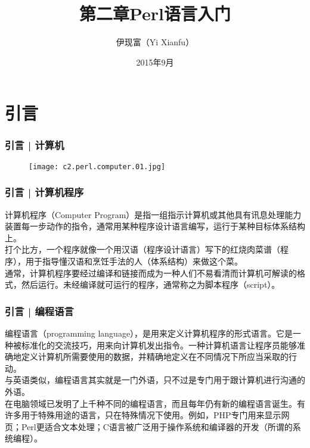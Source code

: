 



\title[Perl语言入门]{第二章\quad Perl语言入门}
\author[Yixf]{伊现富（Yi Xianfu）}
\date{2015年9月}



\section{引言}
\begin{frame}
  \frametitle{引言 | 计算机}
  \begin{figure}
    \centering
    \texttt{[image: c2.perl.computer.01.jpg]}
  \end{figure}
\end{frame}

\begin{frame}
  \frametitle{引言 | 计算机程序}
  计算机程序（Computer Program）是指一组指示计算机或其他具有讯息处理能力装置每一步动作的指令，通常用某种程序设计语言编写，运行于某种目标体系结构上。\\
  \vspace{1em}
  打个比方，一个程序就像一个用汉语（程序设计语言）写下的红烧肉菜谱（程序），用于指导懂汉语和烹饪手法的人（体系结构）来做这个菜。\\
  \vspace{1em}
  通常，计算机程序要经过编译和链接而成为一种人们不易看清而计算机可解读的格式，然后运行。未经编译就可运行的程序，通常称之为脚本程序（script）。
\end{frame}

\begin{frame}
  \frametitle{引言 | 编程语言}
编程语言（programming language），是用来定义计算机程序的形式语言。它是一种被标准化的交流技巧，用来向计算机发出指令。一种计算机语言让程序员能够准确地定义计算机所需要使用的数据，并精确地定义在不同情况下所应当采取的行动。\\
  \vspace{1em}
与英语类似，编程语言其实就是一门外语，只不过是专门用于跟计算机进行沟通的外语。\\
  \vspace{1em}
在电脑领域已发明了上千种不同的编程语言，而且每年仍有新的编程语言诞生。有许多用于特殊用途的语言，只在特殊情况下使用。例如，PHP专门用来显示网页；Perl更适合文本处理；C语言被广泛用于操作系统和编译器的开发（所谓的系统编程）。
\end{frame}

